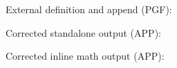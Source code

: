 \documentclass{article}
\begin{document}

\noindent External definition and append (PGF):\par
{}
\par\bigskip\noindent Corrected standalone output (APP):\par

\par\bigskip\noindent Corrected inline math output (APP):\par
\[

\]
\end{document}
